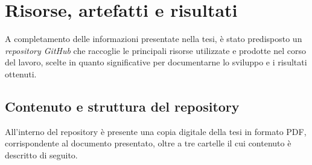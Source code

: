 
\begin{table}[t]
    \centering
    \caption[Parametri di campionamento definiti]{Parametri di campionamento definiti per il \sreagent{} e il \codeagent{}.}
    \label{tab:sampling_parameters}
\end{table}

\chapter{Risorse, artefatti e risultati} \label{app:risorse}

A completamento delle informazioni presentate nella tesi, è stato predisposto un \emph{repository GitHub} che raccoglie le principali risorse utilizzate e prodotte nel corso del lavoro, scelte in quanto significative per documentarne lo sviluppo e i risultati ottenuti.


\section{Contenuto e struttura del repository}

All'interno del repository è presente una copia digitale della tesi in formato PDF, corrispondente al documento presentato, oltre a tre cartelle il cui contenuto è descritto di seguito.


